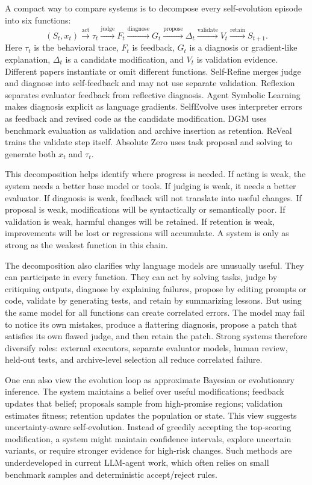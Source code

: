 A compact way to compare systems is to decompose every self-evolution episode into six functions:
\begin{equation}
(S_t, x_t) \xrightarrow{\mathrm{act}} \tau_t \xrightarrow{\mathrm{judge}} F_t \xrightarrow{\mathrm{diagnose}} G_t \xrightarrow{\mathrm{propose}} \Delta_t \xrightarrow{\mathrm{validate}} V_t \xrightarrow{\mathrm{retain}} S_{t+1}.
\end{equation}
Here $\tau_t$ is the behavioral trace, $F_t$ is feedback, $G_t$ is a diagnosis or gradient-like explanation, $\Delta_t$ is a candidate modification, and $V_t$ is validation evidence. Different papers instantiate or omit different functions. Self-Refine merges judge and diagnose into self-feedback and may not use separate validation. Reflexion separates evaluator feedback from reflective diagnosis. Agent Symbolic Learning makes diagnosis explicit as language gradients. SelfEvolve uses interpreter errors as feedback and revised code as the candidate modification. DGM uses benchmark evaluation as validation and archive insertion as retention. ReVeal trains the validate step itself. Absolute Zero uses task proposal and solving to generate both $x_t$ and $\tau_t$.

This decomposition helps identify where progress is needed. If acting is weak, the system needs a better base model or tools. If judging is weak, it needs a better evaluator. If diagnosis is weak, feedback will not translate into useful changes. If proposal is weak, modifications will be syntactically or semantically poor. If validation is weak, harmful changes will be retained. If retention is weak, improvements will be lost or regressions will accumulate. A system is only as strong as the weakest function in this chain.

The decomposition also clarifies why language models are unusually useful. They can participate in every function. They can act by solving tasks, judge by critiquing outputs, diagnose by explaining failures, propose by editing prompts or code, validate by generating tests, and retain by summarizing lessons. But using the same model for all functions can create correlated errors. The model may fail to notice its own mistakes, produce a flattering diagnosis, propose a patch that satisfies its own flawed judge, and then retain the patch. Strong systems therefore diversify roles: external executors, separate evaluator models, human review, held-out tests, and archive-level selection all reduce correlated failure.

One can also view the evolution loop as approximate Bayesian or evolutionary inference. The system maintains a belief over useful modifications; feedback updates that belief; proposals sample from high-promise regions; validation estimates fitness; retention updates the population or state. This view suggests uncertainty-aware self-evolution. Instead of greedily accepting the top-scoring modification, a system might maintain confidence intervals, explore uncertain variants, or require stronger evidence for high-risk changes. Such methods are underdeveloped in current LLM-agent work, which often relies on small benchmark samples and deterministic accept/reject rules.

